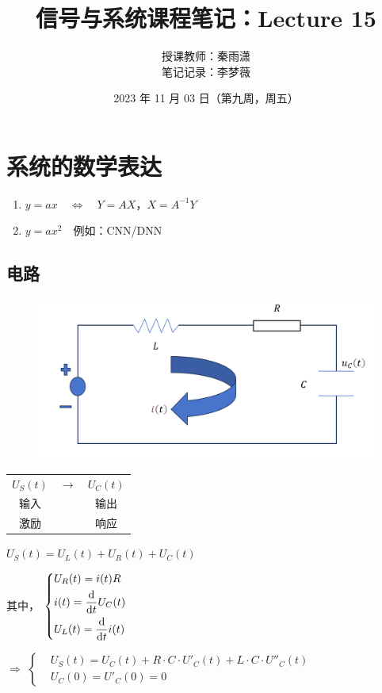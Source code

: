 \documentclass[UTF8]{ctexart}
\begin{document}
\title{信号与系统课程笔记：Lecture 15}
\author{授课教师：秦雨潇 \\
        笔记记录：李梦薇}
\date{2023 年 11 月 03 日（第九周，周五）}
\maketitle

\section{系统的数学表达}
\begin{enumerate}[label=(\arabic*),itemindent=0pt,labelindent=\parindent,labelwidth=2em,labelsep=5pt,leftmargin=*]
      \item $y=ax\quad\Longleftrightarrow\quad{Y=AX}$，$X=A^{-1}Y$
      \item $y=ax^2\quad$例如：CNN/DNN
\end{enumerate}\par
\subsection{电路}
\begin{figure}[h]
      \centering
      \includegraphics[scale=0.35]{电路.png}
\end{figure}
\begin{center}
      \begin{tabular}{ c c c }
            $U_S(t)$ & $\rightarrow$ & $U_C(t)$ \\
            输入 & $\quad$ & 输出 \\
            激励 & $\quad$ & 响应
      \end{tabular}
\end{center} \par
$U_S(t)=U_L(t)+U_R(t)+U_C(t)$ \par
其中，
$\left\{
      \begin{aligned}
            &U_R(t)=i(t)R \\
            &i(t)=\frac{{\rm{d}}}{{\rm{d}}t}U_C(t) \\
            &U_L(t)=\frac{{\rm{d}}}{{\rm{d}}t}i(t)
      \end{aligned}
\right.$ \par
$\Longrightarrow$
$\left\{
      \begin{aligned}
            &{U_S(t)}=U_C(t)+R\cdot{C}\cdot{U'_C(t)}+L\cdot{C}\cdot{U''_C(t)} \\
            &U_C(0)=U'_C(0)=0
      \end{aligned}
\right.$ \par
\newpage
\end{document}
